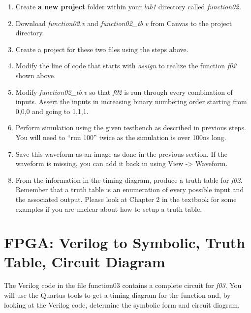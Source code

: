 \begin{enumerate}
\def\labelenumi{\arabic{enumi}.}
\item
  Create \textbf{a new project} folder within your \emph{lab1} directory
  called \emph{function02.}
\item
  Download \emph{function02.v} and \emph{function02\_tb.v} from Canvas
  to the project directory.
\item
  Create a project for these two files using the steps above.
\item
  \protect\hypertarget{Part_2_Step_4}{}{}Modify the line of code that
  starts with \emph{assign} to realize the function \emph{f02} shown
  above.
\item
  Modify \emph{function02\_tb.v} so that \emph{f02} is run through every
  combination of inputs. Assert the inputs in increasing binary
  numbering order starting from 0,0,0 and going to 1,1,1.
\item
  Perform simulation using the given testbench as described in previous
  steps. You will need to ``run 100'' twice as the simulation is over
  100ns long.
\item
  \protect\hypertarget{Part_2_Step_7}{}{}Save this waveform as an image
  as done in the previous section. If the waveform is missing, you can
  add it back in using View -\textgreater{} Waveform.
\item
  \protect\hypertarget{Part_2_Step_8}{}{}From the information in the
  timing diagram, produce a truth table for \emph{f02}. Remember that a
  truth table is an enumeration of every possible input and the
  associated output. Please look at Chapter 2 in the textbook for some
  examples if you are unclear about how to setup a truth table.
\end{enumerate}

\section{FPGA: Verilog to Symbolic, Truth Table, Circuit Diagram}

The Verilog code in the file function03 contains a complete circuit for
\emph{f03}. You will use the Quartus tools to get a timing diagram for
the function and, by looking at the Verilog code, determine the symbolic
form and circuit diagram.

